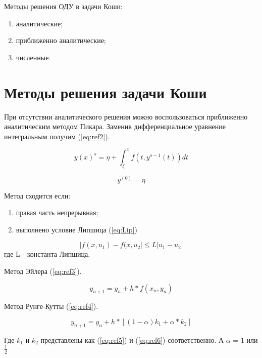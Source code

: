 Методы решения ОДУ в задачи Коши:

\begin{enumerate}
	\item аналитические;
	\item приближенно аналитические;
	\item численные.
\end{enumerate}

\section{Методы решения задачи Коши}

При отсутствии аналитического решения можно воспользоваться приближенно аналитическим методом Пикара.
Заменив дифференциальное уравнение интегральным получим (\ref{eq:ref2}).

\begin{equation}
	y(x)^{s} = \eta + \int_{\xi}^{x} f(t, y^{s-1}(t)) dt
	\label{eq:ref2}
\end{equation}

\begin{equation}
y^{(0)} = \eta
\end{equation}

Метод сходится если:

\begin{enumerate}
	\item правая часть непрерывная;
	\item выполнено условие Липшица (\ref{eq:Lip})
\end{enumerate}

\begin{equation}
	|f(x, u_1) - f(x, u_2| \leq L |u_1-u_2|
	\label{eq:Lip}
\end{equation}
где L - константа Липшица.
	
Метод Эйлера (\ref{eq:ref3}).

\begin{equation}
	y_{n+1} = y_n + h*f(x_n, y_n)
	\label{eq:ref3}
\end{equation}


Метод Рунге-Кутты (\ref{eq:ref4}).

\begin{equation}
	y_{n+1} = y_n + h*[(1-\alpha)k_1 + \alpha * k_2]
	\label{eq:ref4}
\end{equation}

Где $k_1$ и $k_2$ представлены как (\ref{eq:ref5}) и (\ref{eq:ref6}) соответственно. А $\alpha$ = 1 или $\frac{1}{2}$

